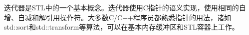 迭代器是STL中的一个基本概念。迭代器使用C指针的语义实现，使用相同的自增、自减和解引用操作符。大多数C/C++程序员都熟悉指针的用法，诸如std::sort和std::transform等算法，可以在基本内存缓冲区和STL容器上工作。